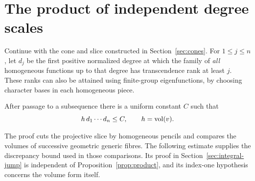 \section{The product of independent degree scales}\label{sec:product}

Continue with the cone and slice constructed in Section~\ref{sec:cones}.
For $1\leq j\leq n$, let $d_j$ be the first positive normalized degree
at which the family of \emph{all} homogeneous functions up to that
degree has transcendence rank at least $j$.  These ranks can also be
attained using finite-group eigenfunctions, by choosing character bases
in each homogeneous piece.

\begin{proposition}\label{prop:product}
After passage to a subsequence there is a uniform constant $C$ such that
\begin{equation}\label{prod:product-bound}
 h\,d_1\cdots d_n\leq C,
 \qquad h=\operatorname{vol}(v).
\end{equation}
\end{proposition}

The proof cuts the projective slice by homogeneous pencils and compares
the volumes of successive geometric generic fibres.  The following
estimate supplies the discrepancy bound used in those comparisons.
Its proof in Section~\ref{sec:integral-jump} is independent of
Proposition~\ref{prop:product}, and its index-one hypothesis concerns
the volume form itself.

